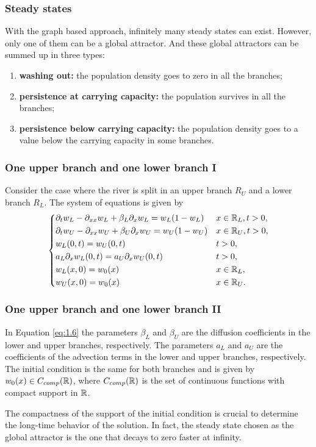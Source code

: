 \begin{frame}
    \frametitle{Steady states}
    With the graph based approach, infinitely many steady states can exist. However, only one of them can be a global attractor. And these global attractors can be summed up in three types:
    \begin{enumerate}
        \item \textbf{washing out:} the population density goes to zero in all the branches;
        \item \textbf{persistence at carrying capacity:} the population survives in all the branches;
        \item \textbf{persistence below carrying capacity:} the population density goes to a value below the carrying capacity in some branches.
    \end{enumerate}
\end{frame}


\begin{frame}
    \frametitle{One upper branch and one lower branch I}
    Consider the case where the river is split in an upper branch \(R_U\) and a lower branch \(R_L\). The system of equations is given by
    \begin{equation}
        \begin{dcases}
            \partial_t w_L - \partial_{xx}w_L + \beta_L \partial_x w_L = w_L(1 - w_L) &  x \in \mathbb{R}_L, t > 0, \\
            \partial_t w_U - \partial_{xx}w_U + \beta_U \partial_x w_U = w_U(1 - w_U) & x \in \mathbb{R}_U, t > 0, \\
            w_L(0, t) = w_U(0, t) &  t > 0, \\
            a_L \partial_x w_L(0, t) = a_U \partial_x w_U(0, t) &  t > 0, \\
            w_L(x, 0) = w_{0}(x) &  x \in \mathbb{R}_L, \\
            w_U(x, 0) = w_{0}(x) &  x \in \mathbb{R}_U.
        \end{dcases}
        \label{eq:1.6}
    \end{equation}
\end{frame}


\begin{frame}
    \frametitle{One upper branch and one lower branch II}
    In Equation \eqref{eq:1.6} the parameters \(\beta_L\) and \(\beta_U\) are the diffusion coefficients in the lower and upper branches, respectively. The parameters \(a_L\) and \(a_U\) are the coefficients of the advection terms in the lower and upper branches, respectively. The initial condition is the same for both branches and is given by \(w_0(x) \in C_{comp}(\mathbb{R})\), where \(C_{comp}(\mathbb{R})\) is the set of continuous functions with compact support in \(\mathbb{R}\).

    The compactness of the support of the initial condition is crucial to determine the long-time behavior of the solution. In fact, the steady state chosen as the global attractor is the one that decays to zero faster at infinity.
\end{frame}

